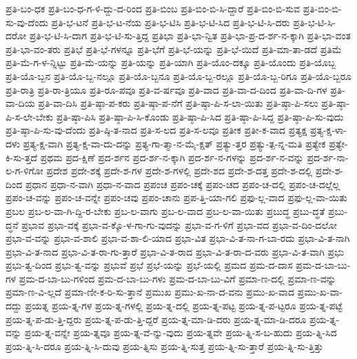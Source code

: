 {ಪ್ರತಿ-ಬಂ-ಧಕ
ಪ್ರತಿ-ಬಂ-ಧ-ಗ-ಳಿ-ದ್ದು-ದ-ರಿಂದ
ಪ್ರತಿ-ಬಿಂಬ
ಪ್ರತಿ-ಬಿಂ-ಬಿ-ಸಿ-ದ್ದಾರೆ
ಪ್ರತಿ-ಬಿಂ-ಬಿ-ಸುವ
ಪ್ರತಿ-ಬಿಂ-ಬಿ-ಸು-ವು-ದೆಂದು
ಪ್ರತಿ-ಭ-ಟನೆ
ಪ್ರತಿ-ಭ-ಟ-ನೆಯ
ಪ್ರತಿ-ಭ-ಟಿಸಿ
ಪ್ರತಿ-ಭ-ಟಿ-ಸಿದ
ಪ್ರತಿ-ಭ-ಟಿ-ಸಿ-ದರು
ಪ್ರತಿ-ಭ-ಟಿ-ಸಿ-ದರೋ
ಪ್ರತಿ-ಭ-ಟಿ-ಸಿ-ದಾಗ
ಪ್ರತಿ-ಭ-ಟಿ-ಸು-ತ್ತಿದ್ದ
ಪ್ರತಿಭಾ
ಪ್ರತಿ-ಭಾ-ನ್ವಿತ
ಪ್ರತಿ-ಭಾ-ಪ್ರ-ದ-ರ್ಶ-ನ-ಕ್ಕಾಗಿ
ಪ್ರತಿ-ಭಾ-ವಂತ
ಪ್ರತಿ-ಭಾ-ವಂ-ತರು
ಪ್ರತಿಭೆ
ಪ್ರತಿ-ಭೆ-ಗಳನ್ನೂ
ಪ್ರತಿ-ಭೆಗೆ
ಪ್ರತಿ-ಭೆ-ಯನ್ನು
ಪ್ರತಿ-ಭೆ-ಯಿದೆ
ಪ್ರತಿ-ಮಾ-ತಾ-ಡದೆ
ಪ್ರತಿಮೆ
ಪ್ರತಿ-ಮೆ-ಗ-ಳ-ನ್ನಿಟ್ಟು
ಪ್ರತಿ-ಮೆ-ಯನ್ನು
ಪ್ರತಿ-ಯನ್ನು
ಪ್ರತಿ-ಯಾಗಿ
ಪ್ರತಿ-ಯೊಂ-ದಕ್ಕೂ
ಪ್ರತಿ-ಯೊಂದು
ಪ್ರತಿ-ಯೊಬ್ಬ
ಪ್ರತಿ-ಯೊ-ಬ್ಬನ
ಪ್ರತಿ-ಯೊ-ಬ್ಬ-ನಲ್ಲೂ
ಪ್ರತಿ-ಯೊ-ಬ್ಬನೂ
ಪ್ರತಿ-ಯೊ-ಬ್ಬ-ರಲ್ಲೂ
ಪ್ರತಿ-ಯೊ-ಬ್ಬ-ರಿಗೂ
ಪ್ರತಿ-ಯೊ-ಬ್ಬರೂ
ಪ್ರತಿ-ರಾತ್ರಿ
ಪ್ರತಿ-ರಾ-ತ್ರಿಯೂ
ಪ್ರತಿ-ರೂ-ಪವೂ
ಪ್ರತಿ-ವ-ರ್ಷವೂ
ಪ್ರತಿ-ವಾದ
ಪ್ರತಿ-ವಾ-ದ-ದಿಂದ
ಪ್ರತಿ-ವಾ-ದಿ-ಗಳ
ಪ್ರತಿ-ವಾ-ದಿಯ
ಪ್ರತಿ-ವಾ-ದಿಸಿ
ಪ್ರತಿ-ಷ್ಠಾ-ಪ-ಕರು
ಪ್ರತಿ-ಷ್ಠಾ-ಪ-ನೆಗೆ
ಪ್ರತಿ-ಷ್ಠಾ-ಪಿ-ಸ-ಲಾ-ಯಿತು
ಪ್ರತಿ-ಷ್ಠಾ-ಪಿ-ಸಲು
ಪ್ರತಿ-ಷ್ಠಾ-ಪಿ-ಸ-ಲೇ-ಬೇಕು
ಪ್ರತಿ-ಷ್ಠಾ-ಪಿಸಿ
ಪ್ರತಿ-ಷ್ಠಾ-ಪಿ-ಸಿ-ಕೊಂಡು
ಪ್ರತಿ-ಷ್ಠಾ-ಪಿ-ಸಿದ
ಪ್ರತಿ-ಷ್ಠಾ-ಪಿ-ಸಿದ್ದ
ಪ್ರತಿ-ಷ್ಠಾ-ಪಿ-ಸು-ವುದು
ಪ್ರತಿ-ಷ್ಠಾ-ಪಿ-ಸು-ವು-ದೆಂದು
ಪ್ರತಿ-ಷ್ಠಿ-ತ-ನಾದ
ಪ್ರತಿ-ಸ-ಲದ
ಪ್ರತಿ-ಸ-ಲವೂ
ಪ್ರತೀಕ
ಪ್ರತೀ-ಕ-ವಾದ
ಪ್ರತ್ಯಕ್ಷ
ಪ್ರತ್ಯ-ಕ್ಷ-ಳಾ-ದಳು
ಪ್ರತ್ಯ-ಕ್ಷ-ವಾಗಿ
ಪ್ರತ್ಯ-ಕ್ಷ-ವಾ-ದು-ದನ್ನು
ಪ್ರತ್ಯ-ಗಾ-ತ್ಮಾ-ನ-ಮೈ-ಕ್ಷತ್
ಪ್ರತ್ಯು-ತ್ತರ
ಪ್ರತ್ಯು-ತ್ಪ-ನ್ನ-ಮತಿ
ಪ್ರತ್ಯೇಕ
ಪ್ರತ್ಯೇ-ಕಿ-ಸು-ತ್ತದೆ
ಪ್ರಥಮ
ಪ್ರದ-ಕ್ಷಿಣೆ
ಪ್ರದ-ರ್ಶನ
ಪ್ರದ-ರ್ಶ-ನ-ಕ್ಕಾಗಿ
ಪ್ರದ-ರ್ಶ-ನ-ಗಳನ್ನು
ಪ್ರದ-ರ್ಶ-ನ-ವನ್ನು
ಪ್ರದ-ರ್ಶ-ನಾ-ಲ-ಗ-ಳಿಗೋ
ಪ್ರದೇಶ
ಪ್ರದೇ-ಶಕ್ಕೆ
ಪ್ರದೇ-ಶ-ಗಳ
ಪ್ರದೇ-ಶ-ಗಳಲ್ಲಿ
ಪ್ರದೇ-ಶದ
ಪ್ರದೇ-ಶ-ದತ್ತ
ಪ್ರದೇ-ಶ-ದಲ್ಲಿ
ಪ್ರದೇ-ಶ-ದಿಂದ
ಪ್ರಧಾನ
ಪ್ರಧಾ-ನ-ವಾಗಿ
ಪ್ರಧಾ-ನ-ವಾದ
ಪ್ರಪಂಚ
ಪ್ರಪಂ-ಚಕ್ಕೆ
ಪ್ರಪಂ-ಚದ
ಪ್ರಪಂ-ಚ-ದಲ್ಲಿ
ಪ್ರಪಂ-ಚ-ದಲ್ಲೆಲ್ಲ
ಪ್ರಪಂ-ಚ-ವನ್ನು
ಪ್ರಪಂ-ಚ-ವನ್ನೇ
ಪ್ರಪಂ-ಚವು
ಪ್ರಪಂ-ಚಾನು
ಪ್ರಪ-ತ್ತಿ-ಯಾ-ಗಲಿ
ಪ್ರಫು-ಲ್ಲ-ವಾದ
ಪ್ರಫು-ಲ್ಲ-ವಾ-ಯಿತು
ಪ್ರಬಲ
ಪ್ರಬ-ಲ-ವಾ-ಗಿ-ದ್ದಿ-ರ-ಬೇಕು
ಪ್ರಬ-ಲ-ವಾಗು
ಪ್ರಬ-ಲ-ವಾದ
ಪ್ರಬ-ಲ-ವಾ-ಯಿತು
ಪ್ರಬುದ್ಧ
ಪ್ರಬು-ದ್ಧತೆ
ಪ್ರಬು-ದ್ಧನೆ
ಪ್ರಭಾವ
ಪ್ರಭಾ-ವಕ್ಕೆ
ಪ್ರಭಾ-ವ-ಕ್ಕೊ-ಳ-ಗಾ-ಗು-ವುದನ್ನು
ಪ್ರಭಾ-ವ-ಗ-ಳಿಗೆ
ಪ್ರಭಾ-ವದ
ಪ್ರಭಾ-ವ-ದಿಂ-ದಲೋ
ಪ್ರಭಾ-ವ-ವನ್ನು
ಪ್ರಭಾ-ವ-ಶಾಲಿ
ಪ್ರಭಾ-ವ-ಶಾ-ಲಿ-ಯಾದ
ಪ್ರಭಾ-ವಿತ
ಪ್ರಭಾ-ವಿ-ತ-ನಾ-ಗ-ಬಾ-ರದು
ಪ್ರಭಾ-ವಿ-ತ-ನಾಗಿ
ಪ್ರಭಾ-ವಿ-ತ-ನಾದ
ಪ್ರಭಾ-ವಿ-ತ-ರಾ-ಗು-ತ್ತಾರೆ
ಪ್ರಭಾ-ವಿ-ತ-ರಾದ
ಪ್ರಭಾ-ವಿ-ತ-ರಾ-ದ-ವರು
ಪ್ರಭಾ-ವಿ-ತ-ವಾಗಿ
ಪ್ರಭು
ಪ್ರಭು-ತ್ವ-ದಿಂದ
ಪ್ರಭು-ತ್ವ-ವನ್ನು
ಪ್ರಭುವೆ
ಪ್ರಭೆ
ಪ್ರಭೆ-ಯನ್ನು
ಪ್ರಭೆ-ಯಲ್ಲಿ
ಪ್ರಮದ
ಪ್ರಮ-ದ-ದಾಸ
ಪ್ರಮ-ದ-ಬಾ-ಬು-ಗಳ
ಪ್ರಮ-ದ-ಬಾ-ಬು-ಗಳಿಂದ
ಪ್ರಮ-ದ-ಬಾ-ಬು-ಗಳು
ಪ್ರಮ-ದ-ಬಾ-ಬು-ವಿಗೆ
ಪ್ರಮಾ-ಣ-ದಲ್ಲಿ
ಪ್ರಮಾ-ಣ-ವನ್ನು
ಪ್ರಮಾ-ಣ-ವಿ-ಲ್ಲದೆ
ಪ್ರಮಾ-ಣೀ-ಕ-ರಿ-ಸು-ತ್ತಾನೆ
ಪ್ರಮುಖ
ಪ್ರಮು-ಖ-ನಾ-ದ-ವನು
ಪ್ರಮು-ಖ-ವಾದ
ಪ್ರಮು-ಖ-ವಾ-ದದ್ದು
ಪ್ರಯತ್ನ
ಪ್ರಯ-ತ್ನ-ಗಳ
ಪ್ರಯ-ತ್ನ-ಗಳಲ್ಲಿ
ಪ್ರಯ-ತ್ನ-ದಲ್ಲಿ
ಪ್ರಯ-ತ್ನ-ಪಟ್ಟ
ಪ್ರಯ-ತ್ನ-ಪ-ಟ್ಟರೂ
ಪ್ರಯ-ತ್ನ-ಪಟ್ಟೆ
ಪ್ರಯ-ತ್ನ-ಪ-ಡು-ತ್ತಿ-ದ್ದರು
ಪ್ರಯ-ತ್ನ-ಪ-ಡು-ತ್ತಿ-ದ್ದರೆ
ಪ್ರಯ-ತ್ನ-ಮಾ-ಡಿ-ದರು
ಪ್ರಯ-ತ್ನ-ಮಾ-ಡಿ-ದರೂ
ಪ್ರಯ-ತ್ನ-ವನ್ನು
ಪ್ರಯ-ತ್ನ-ವನ್ನೇ
ಪ್ರಯ-ತ್ನವೂ
ಪ್ರಯ-ತ್ನ-ವೆ-ನ್ನು-ವುದು
ಪ್ರಯ-ತ್ನವೇ
ಪ್ರಯ-ತ್ನಿ-ಸ-ಬ-ಹುದು
ಪ್ರಯ-ತ್ನಿ-ಸಿದ
ಪ್ರಯ-ತ್ನಿ-ಸಿ-ದರೂ
ಪ್ರಯ-ತ್ನಿ-ಸಿ-ದುವು
ಪ್ರಯ-ತ್ನಿಸು
ಪ್ರಯ-ತ್ನಿ-ಸುತ್ತ
ಪ್ರಯ-ತ್ನಿ-ಸು-ತ್ತಾರೆ
ಪ್ರಯ-ತ್ನಿ-ಸು-ತ್ತಿತ್ತು
}
